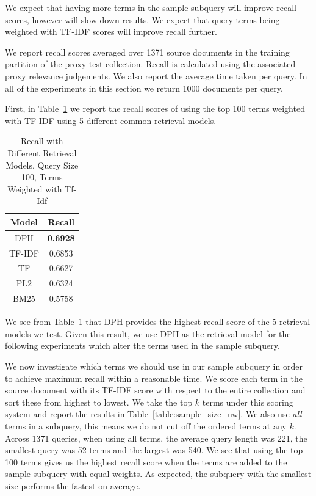 \documentclass{mpaper}
\begin{document}
We expect that having more terms in the sample subquery will improve recall scores, however will slow down results. We expect that query terms being weighted with TF-IDF scores will improve recall further.


We report recall scores averaged over 1371 source documents in the training partition of the proxy test collection. Recall is calculated using the associated proxy relevance judgements.
We also report the average time taken per query.
In all of the experiments in this section we return 1000 documents per query.

First, in Table~\ref{table:recallmodel} we report the recall scores of using the top 100 terms weighted with TF-IDF using 5 different common retrieval models.
\begin{table}[H]
\centering
\begin{tabular}{|c|c|}
\hline
Model	 		& Recall 				\\ \hline
DPH 			& \textbf{0.6928} 		\\
TF-IDF 			& 0.6853 				\\
TF 				& 0.6627 				\\
PL2 			& 0.6324 				\\
BM25 			& 0.5758 				\\ \hline
\end{tabular}
\caption{Recall with Different Retrieval Models, Query Size 100, Terms Weighted with Tf-Idf}
\label{table:recallmodel}
\end{table}

We see from Table~\ref{table:recallmodel} that DPH provides the highest recall score of the 5 retrieval models we test. Given this result, we use DPH as the retrieval model for the following experiments which alter the terms used in the sample subquery.

We now investigate which terms we should use in our sample subquery in order to achieve maximum recall within a reasonable time. We score each term in the source document with its TF-IDF score with respect to the entire collection and sort these from highest to lowest. We take the top $k$ terms under this scoring system and report the results in Table~\ref{table:sample_size_uw}.
We also use \textit{all} terms in a subquery, this means we do not cut off the ordered terms at any $k$. Across 1371 queries, when using all terms,  the average query length was 221, the smallest query was 52 terms and the largest was 540.
We see that using the top 100 terms gives us the highest recall score when the terms are added to the sample subquery with equal weights. As expected, the subquery with the smallest size performs the fastest on average.
\end{document}
